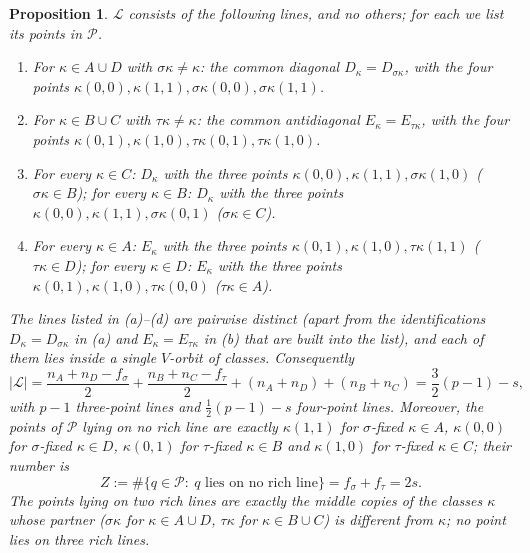 \documentclass[11pt]{article}
\newtheorem{proposition}[theorem]{Proposition}
\theoremstyle{remark}
\newcommand{\Lc}{\mathcal{L}}
\newcommand{\Pset}{\mathcal{P}}
\begin{document}
\begin{proposition}\label{prop:lines}
$\Lc$ consists of the following lines, and no others; for each we list its points in $\Pset$.
\begin{enumerate}
\item[(a)] For $\kappa\in A\cup D$ with $\sigma\kappa\ne\kappa$: the common diagonal $D_\kappa=D_{\sigma\kappa}$, with the
 four points $\kappa(0,0),\kappa(1,1),\sigma\kappa(0,0),\sigma\kappa(1,1)$.
\item[(b)] For $\kappa\in B\cup C$ with $\tau\kappa\ne\kappa$: the common antidiagonal $E_\kappa=E_{\tau\kappa}$, with the
 four points $\kappa(0,1),\kappa(1,0),\tau\kappa(0,1),\tau\kappa(1,0)$.
\item[(c)] For every $\kappa\in C$: $D_\kappa$ with the three points $\kappa(0,0),\kappa(1,1),\sigma\kappa(1,0)$
 ($\sigma\kappa\in B$); for every $\kappa\in B$: $D_\kappa$ with the three points
 $\kappa(0,0),\kappa(1,1),\sigma\kappa(0,1)$ ($\sigma\kappa\in C$).
\item[(d)] For every $\kappa\in A$: $E_\kappa$ with the three points $\kappa(0,1),\kappa(1,0),\tau\kappa(1,1)$
 ($\tau\kappa\in D$); for every $\kappa\in D$: $E_\kappa$ with the three points $\kappa(0,1),\kappa(1,0),\tau\kappa(0,0)$
 ($\tau\kappa\in A$).
\end{enumerate}
The lines listed in (a)--(d) are pairwise distinct (apart from the identifications $D_\kappa=D_{\sigma\kappa}$ in (a) and
$E_\kappa=E_{\tau\kappa}$ in (b) that are built into the list), and each of them lies inside a single $V$-orbit
of classes.  Consequently
\begin{equation}\label{eq:L}
 |\Lc|=\frac{n_A+n_D-f_\sigma}{2}+\frac{n_B+n_C-f_\tau}{2}+(n_A+n_D)+(n_B+n_C)
 =\frac32(p-1)-s,
\end{equation}
with $p-1$ three-point lines and $\tfrac12(p-1)-s$ four-point lines.  Moreover, the points of $\Pset$ lying on
\emph{no} rich line are exactly $\kappa(1,1)$ for $\sigma$-fixed $\kappa\in A$, $\kappa(0,0)$ for $\sigma$-fixed
$\kappa\in D$, $\kappa(0,1)$ for $\tau$-fixed $\kappa\in B$ and $\kappa(1,0)$ for $\tau$-fixed $\kappa\in C$; their number is
\begin{equation}\label{eq:Z}
 Z:=\#\{q\in\Pset:\ q\text{ lies on no rich line}\}=f_\sigma+f_\tau=2s .
\end{equation}
The points lying on \emph{two} rich lines are exactly the middle copies of the classes $\kappa$ whose partner
($\sigma\kappa$ for $\kappa\in A\cup D$, $\tau\kappa$ for $\kappa\in B\cup C$) is different from $\kappa$; no point lies on three
rich lines.
\end{proposition}
\end{document}
